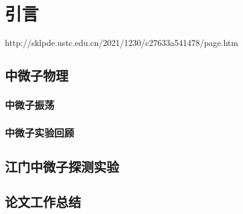 
\chapter{引言}
http://sklpde.ustc.edu.cn/2021/1230/c27633a541478/page.htm

\section{中微子物理}

\subsection{中微子振荡}

\subsection{中微子实验回顾}



\section{江门中微子探测实验}



\section{论文工作总结}


